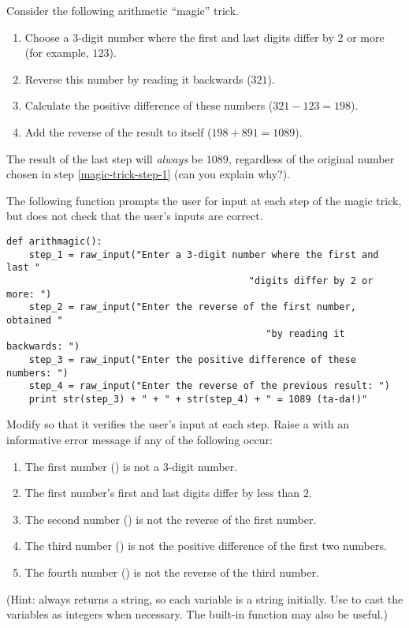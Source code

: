 \begin{problem} %
Consider the following arithmetic ``magic'' trick.
\begin{enumerate}
    \item Choose a 3-digit number where the first and last digits differ by 2 or more (for example, $123$).
    \label{magic-trick-step-1}
    \item Reverse this number by reading it backwards ($321$).
    \item Calculate the positive difference of these numbers ($321 - 123 = 198$).
    \item Add the reverse of the result to itself ($198 + 891 = 1089$).
\end{enumerate}
The result of the last step will \emph{always} be $1089$, regardless of the original number chosen in step \ref{magic-trick-step-1} (can you explain why?).

The following function prompts the user for input at each step of the magic trick, but does not check that the user's inputs are correct.
\newpage
\begin{lstlisting}
def arithmagic():
    step_1 = raw_input("Enter a 3-digit number where the first and last "
                                           "digits differ by 2 or more: ")
    step_2 = raw_input("Enter the reverse of the first number, obtained "
                                              "by reading it backwards: ")
    step_3 = raw_input("Enter the positive difference of these numbers: ")
    step_4 = raw_input("Enter the reverse of the previous result: ")
    print str(step_3) + " + " + str(step_4) + " = 1089 (ta-da!)"
\end{lstlisting}

Modify  so that it verifies the user's input at each step.
Raise a  with an informative error message if any of the following occur:
\begin{enumerate}
\item The first number () is not a 3-digit number.
\item The first number's first and last digits differ by less than $2$.
\item The second number () is not the reverse of the first number.
\item The third number () is not the positive difference of the first two numbers.
\item The fourth number () is not the reverse of the third number.
\end{enumerate}
%
(Hint:  always returns a string, so each variable is a string initially. Use  to cast the variables as integers when necessary. The built-in function  may also be useful.)
\end{problem}

